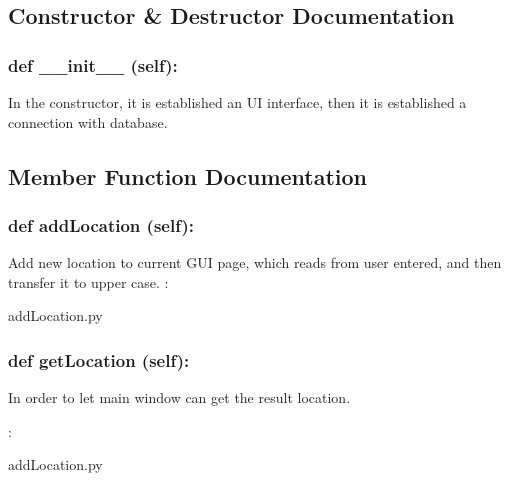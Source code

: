 \subsection{Constructor \& Destructor Documentation}
\hypertarget{class_poly_aa3def076b74bed67904976ad4f9fe9b1}{
\subsubsection[{def __init__ (self):}]{\setlength{\rightskip}{0pt plus 5cm}def {\_\_init\_\_} (self): 
}}

In the constructor, it is established an UI interface, then it is  established a connection with database.

\subsection{Member Function Documentation}

\hypertarget{class_poly_a14a7ad77ce612b0c54f531d307ee4b39}{
\subsubsection[{def addLocation(self):}]{\setlength{\rightskip}{0pt plus 5cm}def {addLocation} (self):}}\label{class_poly_a14a7ad77ce612b0c54f531d307ee4b39}
Add new location to current GUI page, which reads from user entered, and then transfer it to upper case.
:\begin{DoxyCompactItemize}
\item 
addLocation.\-py\end{DoxyCompactItemize}

\hypertarget{class_poly_a14a7ad77ce612b0c54f531d307ee4b39}{
\subsubsection[{def getLocation(self):}]{\setlength{\rightskip}{0pt plus 5cm}def {getLocation} (self):}}\label{class_poly_a14a7ad77ce612b0c54f531d307ee4b39}
In order to let main window can get the result location.

:\begin{DoxyCompactItemize}
\item 
addLocation.\-py\end{DoxyCompactItemize}

